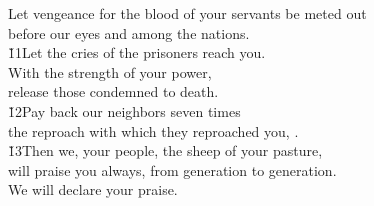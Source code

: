\begin{poetry}
\poemll    Let vengeance for the blood of your servants be meted out \\
\poemlll       before our eyes and among the nations. \\
\poeml \v{11}Let the cries of the prisoners reach you. \\
\poemll    With the strength of your power, \\
\poemlll       release those condemned to death. \\
\poeml \v{12}Pay back our neighbors seven times \\
\poemll    the reproach with which they reproached you, . \\
\poemll    \v{13}Then we, your people, the sheep of your pasture, \\
\poemll    will praise you always, from generation to generation. \\
\poemlll       We will declare your praise.
\end{poetry}

